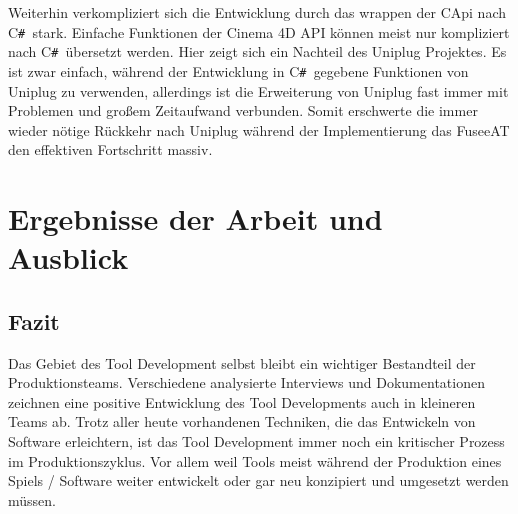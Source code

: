 \documentclass[pagesize, paper=a4, fontsize=12pt, titlepage=true, headings=small, headnosepline, abstractoff, liststotoc, nochapterprefix, plainheadsepline, twoside]{scrreprt}
\newcommand{\CSS}{C\texttt{\# }}
\newcommand{\CPP}{C\nolinebreak\hspace{-.05em}\raisebox{.4ex}{\tiny\bf +}\nolinebreak\hspace{-.10em}\raisebox{.4ex}{\tiny\bf +}}
\begin{document}
Weiterhin verkompliziert sich die Entwicklung durch das wrappen der \CPP Api nach \CSS stark. Einfache Funktionen der Cinema 4D API können meist nur kompliziert nach \CSS übersetzt werden. Hier zeigt sich ein Nachteil des Uniplug Projektes. Es ist zwar einfach, während der Entwicklung in \CSS gegebene Funktionen von Uniplug zu verwenden, allerdings ist die Erweiterung von Uniplug fast immer mit Problemen und großem Zeitaufwand verbunden. Somit erschwerte die immer wieder nötige Rückkehr nach Uniplug während der Implementierung das FuseeAT den effektiven Fortschritt massiv.






\chapter{Ergebnisse der Arbeit und Ausblick}

\section{Fazit}
Das Gebiet des Tool Development selbst bleibt ein wichtiger Bestandteil der Produktionsteams. Verschiedene analysierte Interviews und Dokumentationen zeichnen eine positive Entwicklung des Tool Developments auch in kleineren Teams ab. Trotz aller heute vorhandenen Techniken, die das Entwickeln von Software erleichtern, ist das Tool Development immer noch ein kritischer Prozess im Produktionszyklus. Vor allem weil Tools meist während der Produktion eines Spiels / Software weiter entwickelt oder gar neu konzipiert und umgesetzt werden müssen. \\
\end{document}
